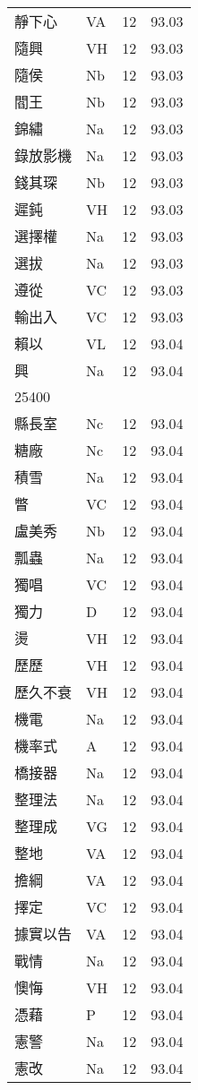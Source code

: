 \documentclass[twocolumn]{book}
\begin{document}
\begin{supertabular}{llrr}
靜下心 & VA & 12 &  93.03\\
隨興 & VH & 12 &  93.03\\
隨侯 & Nb & 12 &  93.03\\
閻王 & Nb & 12 &  93.03\\
錦繡 & Na & 12 &  93.03\\
錄放影機 & Na & 12 &  93.03\\
錢其琛 & Nb & 12 &  93.03\\
遲鈍 & VH & 12 &  93.03\\
選擇權 & Na & 12 &  93.03\\
選拔 & Na & 12 &  93.03\\
遵從 & VC & 12 &  93.03\\
輸出入 & VC & 12 &  93.03\\
賴以 & VL & 12 &  93.04\\
興 & Na & 12 &  93.04\\
25400\\
縣長室 & Nc & 12 &  93.04\\
糖廠 & Nc & 12 &  93.04\\
積雪 & Na & 12 &  93.04\\
瞥 & VC & 12 &  93.04\\
盧美秀 & Nb & 12 &  93.04\\
瓢蟲 & Na & 12 &  93.04\\
獨唱 & VC & 12 &  93.04\\
獨力 & D & 12 &  93.04\\
燙 & VH & 12 &  93.04\\
歷歷 & VH & 12 &  93.04\\
歷久不衰 & VH & 12 &  93.04\\
機電 & Na & 12 &  93.04\\
機率式 & A & 12 &  93.04\\
橋接器 & Na & 12 &  93.04\\
整理法 & Na & 12 &  93.04\\
整理成 & VG & 12 &  93.04\\
整地 & VA & 12 &  93.04\\
擔綱 & VA & 12 &  93.04\\
擇定 & VC & 12 &  93.04\\
據實以告 & VA & 12 &  93.04\\
戰情 & Na & 12 &  93.04\\
懊悔 & VH & 12 &  93.04\\
憑藉 & P & 12 &  93.04\\
憲警 & Na & 12 &  93.04\\
憲改 & Na & 12 &  93.04\\

\end{supertabular}
\end{document}
